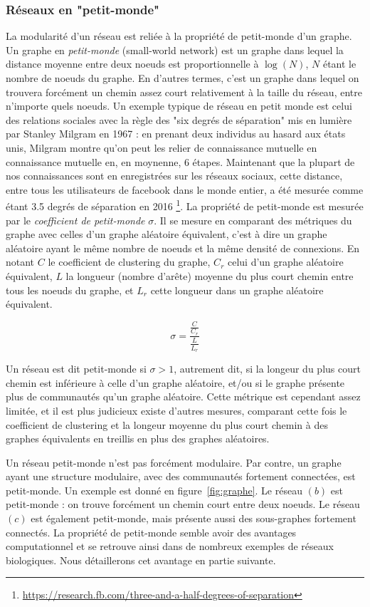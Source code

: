 \subsubsection{Réseaux en "petit-monde"}

La modularité d'un réseau est reliée à la propriété de petit-monde d'un graphe. 
Un graphe en \emph{petit-monde} (small-world network) est un graphe dans lequel la distance moyenne entre deux noeuds est proportionnelle à $\log(N)$, $N$ étant le nombre de noeuds du graphe. En d'autres termes, c'est un graphe dans lequel on trouvera forcément un chemin assez court relativement à la taille du réseau, entre n'importe quels noeuds. Un exemple typique de réseau en petit monde est celui des relations sociales avec la règle des "six degrés de séparation" mis en lumière par Stanley Milgram en 1967 \cite{Milgram1967TheSW} : en prenant deux individus au hasard aux états unis, Milgram montre qu'on peut les relier de connaissance mutuelle en connaissance mutuelle en, en moynenne, 6 étapes. Maintenant que la plupart de nos connaissances sont en enregistrées sur les réseaux sociaux, cette distance, entre tous les utilisateurs de facebook dans le monde entier, a été mesurée comme étant 3.5 degrés de séparation en 2016 \footnote{\url{https://research.fb.com/three-and-a-half-degrees-of-separation}}. La propriété de petit-monde est mesurée par le \emph{coefficient de petit-monde} $\sigma$. Il se mesure en comparant des métriques du graphe avec celles d'un graphe aléatoire équivalent, c'est à dire un graphe aléatoire ayant le même nombre de noeuds et la même densité de connexions. 
En notant $C$ le coefficient de clustering du graphe, $C_r$ celui d'un graphe aléatoire équivalent, $L$ la longueur (nombre d'arête) moyenne du plus court chemin entre tous les noeuds du graphe, et $L_r$ cette longueur dans un graphe aléatoire équivalent. 

$$\sigma = \frac{\frac{C}{C_r}}{\frac{L}{L_r}} $$

Un réseau est dit petit-monde si $\sigma > 1$, autrement dit, si la longeur du plus court chemin est inférieure à celle d'un graphe aléatoire, et/ou si le graphe présente plus de communautés qu'un graphe aléatoire. Cette métrique est cependant assez limitée, et il est plus judicieux existe d'autres mesures, comparant cette fois le coefficient de clustering et la longeur moyenne du plus court chemin à des graphes équivalents en treillis en plus des graphes aléatoires. 

Un réseau petit-monde n'est pas forcément modulaire. Par contre, un graphe ayant une structure modulaire, avec des communautés fortement connectées, est petit-monde. Un exemple est donné en figure~\ref{fig:graphe}. Le réseau $(b)$ est petit-monde : on trouve forcément un chemin court entre deux noeuds. Le réseau $(c)$ est également petit-monde, mais présente aussi des sous-graphes fortement connectés. 
La propriété de petit-monde semble avoir des avantages computationnel et se retrouve ainsi dans de nombreux exemples de réseaux biologiques. Nous détaillerons cet avantage en partie suivante. 

